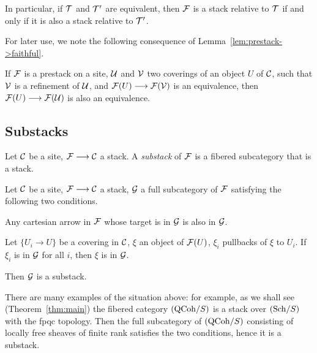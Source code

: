 \begin{4   STACKS}
\begin{4.1 Descent of objects of fibcats}
In particular, if $\mathcal{T}$ and $\mathcal{T}'$ are equivalent, then $\mathcal{F}$ is a stack relative to $\mathcal{T}$ if and only if it is also a stack relative to $\mathcal{T}'$.

For later use, we note the following consequence of Lemma~\ref{lem:prestack->faithful}.

\begin{lemma}\label{lem:pass-to-refinement}
If $\mathcal{F}$ is a prestack on a site, $\mathcal{U}$ and $\mathcal{V}$ two coverings of an object $U$ of $\mathcal{C}$, such that $\mathcal{V}$ is a refinement of $\mathcal{U}$, and $\cF(U) \arr \cF(\cV)$ is an equivalence, then $\cF(U) \arr \cF(\cU)$ is also an equivalence.
\end{lemma}



\subsection{Substacks}


\begin{definition}
Let $\mathcal{C}$ be a site, $\cF \arr \cC$ a stack. A \emph{substack} of $\mathcal{F}$ is a fibered subcategory that is a stack.
\end{definition}

\begin{example}
Let $\mathcal{C}$ be a site, $\cF \arr \cC$ a stack, $\mathcal{G}$ a full subcategory of $\mathcal{F}$ satisfying the following two conditions.

\begin{enumeratei}

\item Any cartesian arrow in $\mathcal{F}$ whose target is in $\mathcal{G}$  is also in $\mathcal{G}$.

\item Let $\{U_i \to U\}$ be a covering in $\mathcal{C}$, $\xi$ an object of $\mathcal{F}(U)$, $\xi_i$ pullbacks of $\xi$ to $U_i$. If $\xi_i$ is in $\mathcal{G}$ for all $i$, then $\xi$ is in $\mathcal{G}$.

\end{enumeratei}

Then $\mathcal{G}$ is a substack.
\end{example}

There are many examples of the situation above: for example, as we shall see (Theorem~\ref{thm:main}) the fibered category $({\mathrm{QCoh}/S})$ is a stack over $({\mathrm{Sch}/S})$ with the fpqc topology. Then the full subcategory of $({\mathrm{QCoh}/S})$ consisting of locally free sheaves of finite rank satisfies the two conditions, hence it is a substack.





\end{4.1 Descent of objects of fibcats}
\end{4   STACKS}
